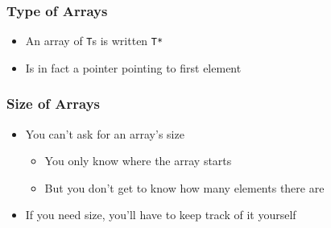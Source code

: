 \begin{frame}
  \frametitle{Type of Arrays}
  \begin{center}
  \end{center}
  \begin{itemize}
    \item An array of \texttt{T}s is written \texttt{T*}
    \item Is in fact a pointer pointing to first element
  \end{itemize}
\end{frame}

\begin{frame}
  \frametitle{Size of Arrays}
  \begin{itemize}
    \item You can't ask for an array's size
          \begin{itemize}
            \item You only know where the array starts
            \item But you don't get to know how many elements there are
          \end{itemize}
    \item If you need size, you'll have to keep track of it yourself
  \end{itemize}
\end{frame}

